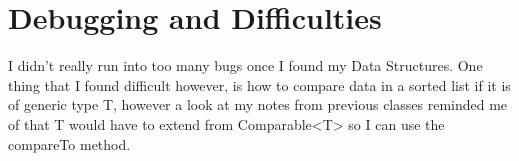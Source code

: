 \documentclass[11pt, oneside]{article}   	%
\begin{document}
\section{Debugging and Difficulties}
I didn't really run into too many bugs once I found my Data Structures. One thing that I found difficult however, is how to compare data in a sorted list if it is of generic type T, however a look at my notes from previous classes reminded me of that T would have to extend from Comparable<T> so I can use the compareTo method. 
\end{document}
